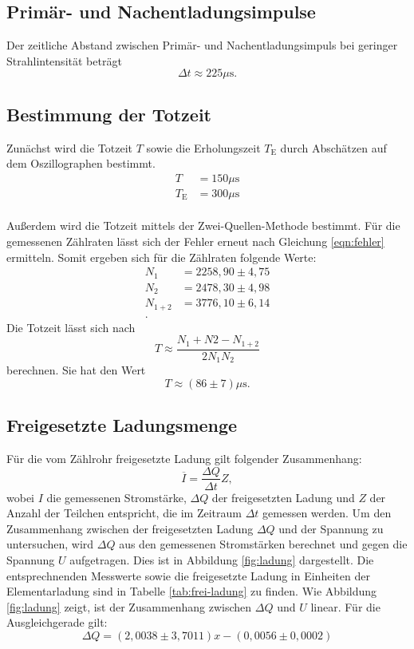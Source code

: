 \subsection{Primär- und Nachentladungsimpulse}
Der zeitliche Abstand zwischen Primär- und Nachentladungsimpuls bei geringer Strahlintensität beträgt
\begin{equation}
  \Delta t \approx 225\mu\si{\second}.
\end{equation}

\subsection{Bestimmung der Totzeit}
Zunächst wird die Totzeit $T$ sowie die Erholungszeit $T_\mathrm{E}$ durch Abschätzen auf dem Oszillographen bestimmt.
\begin{align}
  T &= 150 \mu \si{\second}\\
  T_\mathrm{E} &= 300 \mu\si{\second}\\
\end{align}

Außerdem wird die Totzeit mittels der Zwei-Quellen-Methode bestimmt. Für die gemessenen Zählraten lässt sich der Fehler erneut nach Gleichung \ref{eqn:fehler} ermitteln. Somit ergeben sich für die Zählraten folgende Werte:
\begin{align}
  N_1&=2258,90 \pm 4,75 \\
  N_2 &= 2478,30 \pm 4,98 \\
  N_{1+2} &= 3776,10 \pm 6,14 \\.
\end{align}
Die Totzeit lässt sich nach
\begin{equation}
  T \approx \frac{N_1+N2-N_{1+2}}{2N_1N_2}
\end{equation}
berechnen. Sie hat den Wert
\begin{equation}
  T\approx (86 \pm 7)\mu\si{\second}.
\end{equation}

\subsection{Freigesetzte Ladungsmenge}
Für die vom Zählrohr freigesetzte Ladung gilt folgender Zusammenhang:
\begin{equation}
  \overline{I} = \frac{\Delta Q}{\Delta t} Z,
\end{equation}
wobei $I$ die gemessenen Stromstärke, $\Delta Q$ der freigesetzten Ladung und $Z$ der Anzahl der Teilchen entspricht, die im Zeitraum $\Delta t$ gemessen werden.
Um den Zusammenhang zwischen der freigesetzten Ladung $\Delta Q$ und der Spannung zu untersuchen, wird $\Delta Q$ aus den gemessenen Stromstärken berechnet und gegen die Spannung $U$ aufgetragen. Dies ist in Abbildung \ref{fig:ladung} dargestellt. Die entsprechnenden Messwerte sowie die freigesetzte Ladung in Einheiten der Elementarladung sind in Tabelle \ref{tab:frei-ladung} zu finden.
Wie Abbildung \ref{fig:ladung} zeigt, ist der Zusammenhang zwischen $\Delta Q$ und $U$ linear. Für die Ausgleichgerade gilt:
\begin{equation}
  \Delta Q = (2,0038 \pm 3,7011)x - (0,0056\pm0,0002)
\end{equation}

